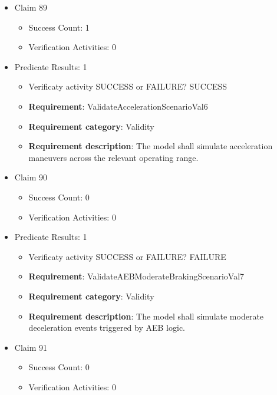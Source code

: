 \documentclass{article}
\begin{document}
\begin{itemize}
  				  \item Claim 89
				\begin{itemize}
			    	\item Success Count: 1 
			    	\item Verification Activities: 0
				\end{itemize}
				
									    
				\item Predicate Results: 1
					\begin{itemize}				
					\item Verificaty activity SUCCESS or FAILURE? SUCCESS
					
					\item \textbf{Requirement}: ValidateAccelerationScenarioVal6 
					\item \textbf{Requirement category}: Validity
					\item \textbf{Requirement description}: The model shall simulate acceleration maneuvers across the relevant operating range.
					\end{itemize}

  				  \item Claim 90
				\begin{itemize}
			    	\item Success Count: 0 
			    	\item Verification Activities: 0
				\end{itemize}
				
									    
				\item Predicate Results: 1
					\begin{itemize}				
					\item Verificaty activity SUCCESS or FAILURE? FAILURE
					
					\item \textbf{Requirement}: ValidateAEBModerateBrakingScenarioVal7 
					\item \textbf{Requirement category}: Validity
					\item \textbf{Requirement description}: The model shall simulate moderate deceleration events triggered by AEB logic.
					\end{itemize}

  				  \item Claim 91
				\begin{itemize}
			    	\item Success Count: 0 
			    	\item Verification Activities: 0
				\end{itemize}
				

\end{itemize}
\end{document}
